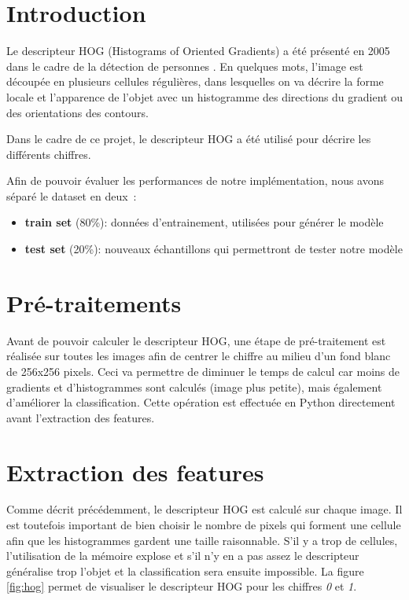 

\section{Introduction}

Le descripteur HOG (Histograms of Oriented Gradients) a été présenté en 2005 dans le cadre de la détection de personnes \cite{NavneetHOG}. En quelques mots, l'image est découpée en plusieurs cellules régulières, dans lesquelles on va décrire la forme locale et l'apparence de l'objet avec un histogramme des directions du gradient ou des orientations des contours.

Dans le cadre de ce projet, le descripteur HOG a été utilisé pour décrire les différents chiffres.

Afin de pouvoir évaluer les performances de notre implémentation, nous avons séparé le dataset en deux~:
\begin{itemize}
\item \textbf{train set} (80\%): données d'entrainement, utilisées pour générer le modèle
\item \textbf{test set} (20\%): nouveaux échantillons qui permettront de tester notre modèle
\end{itemize} 

\section{Pré-traitements}
Avant de pouvoir calculer le descripteur HOG, une étape de pré-traitement est réalisée sur toutes les images afin de centrer le chiffre au milieu d'un fond blanc de 256x256 pixels. Ceci va permettre de diminuer le temps de calcul car moins de gradients et d'histogrammes sont calculés (image plus petite), mais également d'améliorer la classification. Cette opération est effectuée en Python directement avant l'extraction des features.

\section{Extraction des features}

Comme décrit précédemment, le descripteur HOG est calculé sur chaque image. Il est toutefois important de bien choisir le nombre de pixels qui forment une cellule afin que les histogrammes gardent une taille raisonnable. S'il y a trop de cellules, l'utilisation de la mémoire explose et s'il n'y en a pas assez le descripteur généralise trop l'objet et la classification sera ensuite impossible. La figure \vref{fig:hog} permet de visualiser le descripteur HOG pour les chiffres \emph{0} et \emph{1}.


